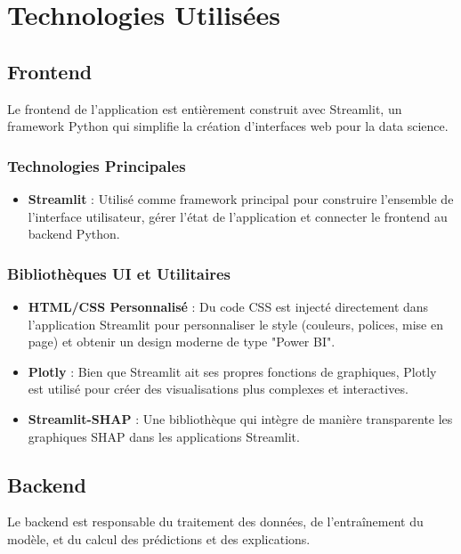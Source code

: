 \chapter{Technologies Utilisées}
\label{chap:technologies}

\section{Frontend}
Le frontend de l'application est entièrement construit avec Streamlit, un framework Python qui simplifie la création d'interfaces web pour la data science.

\subsection{Technologies Principales}
\begin{itemize}
    \item \textbf{Streamlit} : Utilisé comme framework principal pour construire l'ensemble de l'interface utilisateur, gérer l'état de l'application et connecter le frontend au backend Python.
\end{itemize}

\subsection{Bibliothèques UI et Utilitaires}
\begin{itemize}
    \item \textbf{HTML/CSS Personnalisé} : Du code CSS est injecté directement dans l'application Streamlit pour personnaliser le style (couleurs, polices, mise en page) et obtenir un design moderne de type "Power BI".
    \item \textbf{Plotly} : Bien que Streamlit ait ses propres fonctions de graphiques, Plotly est utilisé pour créer des visualisations plus complexes et interactives.
    \item \textbf{Streamlit-SHAP} : Une bibliothèque qui intègre de manière transparente les graphiques SHAP dans les applications Streamlit.
\end{itemize}

\section{Backend}
Le backend est responsable du traitement des données, de l'entraînement du modèle, et du calcul des prédictions et des explications.

